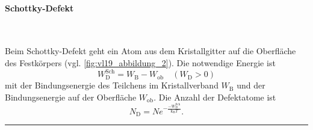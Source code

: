 \paragraph{Schottky-Defekt}\,\\[1em]
	\begin{minipage}{0.3\linewidth}
		\centering
		\label{fig:vl19_abbildung_2}
	\end{minipage}
	\hfill
	\begin{minipage}{0.65\linewidth}
		Beim Schottky-Defekt geht ein Atom aus dem Kristallgitter auf die Oberfläche des Festkörpers (vgl. \autoref{fig:vl19_abbildung_2}). Die notwendige Energie ist
		$$
			W_\mathrm{D}^{\text{Sch}} = W_\mathrm{B} - W_\mathrm{ob} \quad(W_\mathrm{D} >0)
		$$ 
		mit der Bindungsenergie des Teilchens im Kristallverband $W_\mathrm{B}$ und der Bindungsenergie auf der Oberfläche $W_{\text{ob}}$. Die Anzahl der Defektatome ist
		$$
		N_\mathrm{D} = N e^{- \frac{-W_\mathrm{D}^{\text{Sch}}}{\mathrm{k}_\mathrm{B}T}}.
		$$
	\end{minipage}
	\vspace{1em}
	\hrule
	
